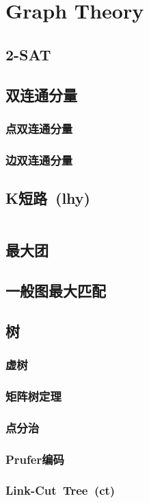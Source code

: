 \chapter{Graph Theory}
\section{2-SAT}
\section{双连通分量}
\subsection{点双连通分量}
\subsection{边双连通分量}
\section{K短路\ \small(lhy)}
\inputminted{cpp}{GraphTheory/kth_minimum_path.cpp}
\section{最大团}
\section{一般图最大匹配}
\section{树}
\subsection{虚树}
\subsection{矩阵树定理}
\subsection{点分治}
\subsection{Prufer编码}
\subsection{Link-Cut\ Tree\ \small(ct)}
\inputminted{cpp}{GraphTheory/link_cut_tree.cpp}
